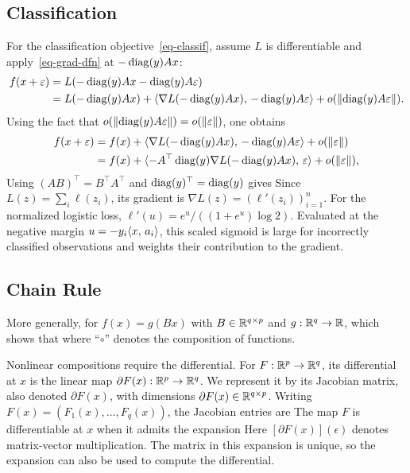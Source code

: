 \subsection{Classification}

For the classification objective~\eqref{eq-classif}, assume $L$ is differentiable and apply~\eqref{eq-grad-dfn} at $-\operatorname{diag}(y) Ax$:
\begin{align*}
	f(x+\varepsilon) &= L( -\operatorname{diag}(y) Ax -\operatorname{diag}(y)  A\varepsilon) \\
	&= L(-\operatorname{diag}(y) Ax) + \langle \nabla L( -\operatorname{diag}(y) Ax),\, -\operatorname{diag}(y)  A\varepsilon \rangle + o(\lVert\operatorname{diag}(y)  A\varepsilon\rVert).
\end{align*} 
Using the fact that $o(\lVert\operatorname{diag}(y)  A\varepsilon\rVert) = o(\lVert\varepsilon\rVert)$, one obtains
\begin{align*}
	f(x+\varepsilon) &= f(x) + \langle \nabla L( -\operatorname{diag}(y) Ax),\,-\operatorname{diag}(y)  A\varepsilon\rangle + o(\lVert\varepsilon\rVert) \\
		 &=  f(x) + \langle -A^\top \operatorname{diag}(y) \nabla L( -\operatorname{diag}(y) Ax),\,\varepsilon\rangle + o(\lVert\varepsilon\rVert), 
\end{align*} 	
Using $(AB)^\top = B^\top A^\top$ and $\operatorname{diag}(y)^\top=\operatorname{diag}(y)$ gives
Since $L(z)=\sum_i\ell(z_i)$, its gradient is $\nabla L(z)=(\ell'(z_i))_{i=1}^n$. For the normalized logistic loss, $\ell'(u)=e^u/((1+e^u)\log 2)$. Evaluated at the negative margin $u=-y_i\langle x,\,a_i\rangle$, this scaled sigmoid is large for incorrectly classified observations and weights their contribution to the gradient.


\subsection{Chain Rule}

More generally, for $f(x) = g(Bx)$ with $B \in \mathbb{R}^{q \times p}$ and $g : \mathbb{R}^q \rightarrow \mathbb{R}$,
which shows that 
where ``$\circ$'' denotes the composition of functions.

Nonlinear compositions require the differential. For $F : \mathbb{R}^p \rightarrow \mathbb{R}^q$, its differential at $x$ is the linear map $\partial F(x) : \mathbb{R}^{p} \rightarrow \mathbb{R}^q$. We represent it by its Jacobian matrix, also denoted $\partial F(x)$, with dimensions $\partial F(x) \in \mathbb{R}^{q \times p}$.
%
Writing $F(x)=(F_1(x), \ldots, F_q(x))$, the Jacobian entries are
The map $F$ is differentiable at $x$ when it admits the expansion
Here $[\partial F(x)](\epsilon)$ denotes matrix-vector multiplication. The matrix in this expansion is unique, so the expansion can also be used to compute the differential.

